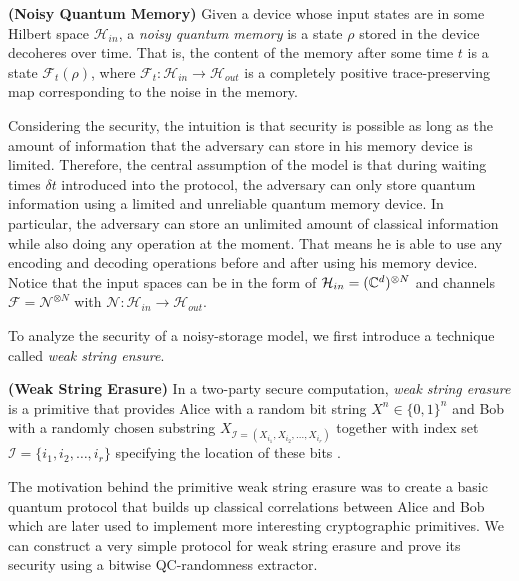 \begin{definition}\textbf{(Noisy Quantum Memory)}
Given a device whose input states are in some Hilbert space $\mathcal{H}_{in}$, a \emph{noisy quantum memory} is a state $\rho$ stored in the device decoheres over time. That is, the content of the memory after some time $t$ is a state $\mathcal{F}_t(\rho)$, where $\mathcal{F}_t : \mathcal{H}_{in} \rightarrow \mathcal{H}_{out}$ is a completely positive trace-preserving map corresponding to the noise in the memory.

Considering the security, the intuition is that security is possible as long as the amount of information that the adversary can store in his memory device is limited. Therefore, the central assumption of the model is that during waiting times $\delta t$ introduced into the protocol, the adversary can only store quantum information using a limited and unreliable quantum memory device. In particular, the adversary can store an unlimited amount of classical information while also doing any operation at the moment. That means he is able to use any encoding and decoding operations before and after using his memory device. Notice that the input spaces can be in the form of $\mathcal{H}_{in} = (\mathbb{C}^d)^{\otimes N}$ and channels $\mathcal{F} = \mathcal{N}^{\otimes N}$ with $\mathcal{N}: \mathcal{H}_{in} \rightarrow \mathcal{H}_{out}$.

To analyze the security of a noisy-storage model, we first introduce a technique called \emph{weak string ensure}.

\begin{definition}\textbf{(Weak String Erasure)}
In a two-party secure computation, \emph{weak string erasure} is a primitive that provides Alice with a random bit string $X^n \in \{0,1\}^n$ and Bob with a randomly chosen substring $X_{\mathcal{I} = (X_{i_1}, X_{i_2}, \dots, X_{i_r})}$ together with index set $\mathcal{I} = \{i_1, i_2, \dots, i_r\}$ specifying the location of these bits \cite{Konig_2012}.
\end{definition}

The motivation behind the primitive weak string erasure was to create a basic quantum protocol that builds up classical correlations between Alice and Bob which are later used to implement more interesting cryptographic primitives. We can construct a very simple protocol for weak string erasure and prove its security using a bitwise QC-randomness extractor.


\end{definition}
